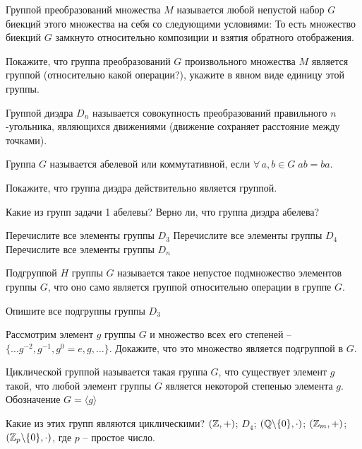 \documentclass[12pt]{article}
\begin{document}

	Группой преобразований множества $M$ называется любой непустой набор $G$ биекций этого множества на себя со следующими условиями:
	То есть множество биекций $G$ замкнуто относительно композиции и взятия обратного отображения.

	Покажите, что группа преобразований $G$ произвольного множества $M$ является группой (относительно какой операции?), укажите в явном виде единицу этой группы.

	Группой диэдра $D_n$ называется совокупность преобразований правильного $n$-угольника, являющихся движениями (движение сохраняет расстояние между точками).
		
	Группа $G$ называется абелевой или коммутативной, если $\forall \, a,b \in  G \; ab=ba$.
	
	
	Покажите, что группа диэдра действительно является группой.
	
	Какие из групп задачи 1 абелевы? Верно ли, что группа диэдра абелева?
	
	 Перечислите все элементы группы $D_3$
	 Перечислите все элементы группы $D_4$
	 Перечислите все элементы группы $D_n$
	
    \vfill
\newpage

	
	Подгруппой $H$ группы $G$ называется такое непустое подмножество элементов группы $G$, что оно само является группой относительно операции в группе $G$.
	
	Опишите все подгруппы группы $D_3$
	
	Рассмотрим элемент $g$ группы $G$ и множество всех его степеней -- $\{ \dots g^{-2}, g^{-1}, g^0=e, g, \dots \}$. Докажите, что это множество является подгруппой в $G$.
	
	Циклической группой называется такая группа $G$, что существует элемент $g$ такой, что любой элемент группы $G$ является некоторой степенью элемента $g$. Обозначение $G=\langle g \rangle $

	 Какие из этих групп являются циклическими?
	 $(\mathbb{Z},+)$;
	 $D_4$;
	 $(\mathbb{Q} \backslash \{0\},\cdot)$;
	 $(\mathbb{Z}_m, +)$;
	 $(\mathbb{Z}_p \backslash \{0\},\cdot)$, где $p$ -- простое число.
	
\end{document}
